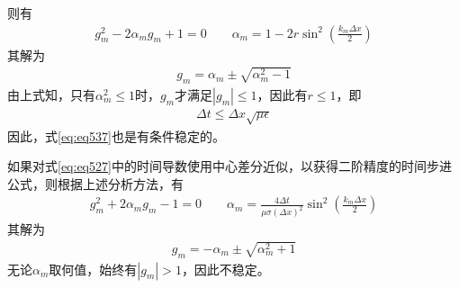 \documentclass{article}
\numberwithin{equation}{section}
\begin{document}
则有
\begin{align}
    \label{eq:eq544}
    g_m^2-2\alpha_mg_m+1=0\qquad\alpha_m=1-2r\sin^2\left(\frac{k_m\Delta x}{2}\right)
\end{align}
其解为
\begin{align}
    \label{eq:eq545}
    g_m=\alpha_m\pm\sqrt{\alpha^2_m-1}
\end{align}
由上式知，只有$\alpha^2_m\leq 1$时，$g_m$才满足$|g_m|\leq 1$，因此有$r\leq1$，即
\begin{align}
    \label{eq:eq546}
    \Delta t\leq\Delta x\sqrt{\mu\epsilon}
\end{align}
因此，式\ref{eq:eq537}也是有条件稳定的。\par
如果对式\ref{eq:eq527}中的时间导数使用中心差分近似，以获得二阶精度的时间步进公式，则根据上述分析方法，有
\begin{align}
    \label{eq:eq547}
    g_m^2+2\alpha_mg_m-1=0\qquad\alpha_m=\frac{4\Delta t}{\mu\sigma(\Delta x)^2}\sin^2\left(\frac{k_m\Delta x}{2}\right)
\end{align}
其解为
\begin{align}
    \label{eq:eq548}
    g_m=-\alpha_m\pm\sqrt{\alpha^2_m+1}
\end{align}
无论$\alpha_m$取何值，始终有$|g_m|>1$，因此不稳定。
\end{document}
